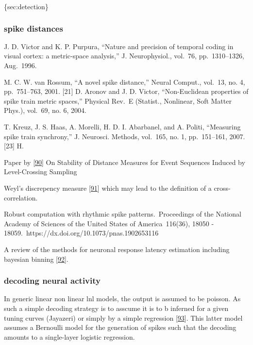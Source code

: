 \{sec:detection\}

\hypertarget{spike-distances}{%
\subsubsection{spike distances}\label{spike-distances}}

J. D. Victor and K. P. Purpura, ``Nature and precision of temporal coding in visual cortex: a metric-space analysis,'' J. Neurophysiol., vol.~76, pp.~1310--1326, Aug.~1996.

M. C. W. van Rossum, ``A novel spike distance,'' Neural Comput., vol.~13, no. 4, pp.~751--763, 2001. {[}21{]} D. Aronov and J. D. Victor, ``Non-Euclidean properties of spike train metric spaces,'' Physical Rev.~E (Statist., Nonlinear, Soft Matter Phys.), vol.~69, no. 6, 2004.

T. Kreuz, J. S. Haas, A. Morelli, H. D. I. Abarbanel, and A. Politi, ``Measuring spike train synchrony,'' J. Neurosci. Methods, vol.~165, no. 1, pp.~151--161, 2007. {[}23{]} H.

Paper by {[}\protect\hyperlink{ref-LjkTSK3h}{90}{]} On Stability of Distance Measures for Event Sequences Induced by Level-Crossing Sampling

Weyl's discrepency measure {[}\protect\hyperlink{ref-RYzP72lj}{91}{]} which may lead to the definition of a cross-correlation.

Robust computation with rhythmic spike patterns.~Proceedings of the National Academy of Sciences of the United States of America~116(36), 18050 - 18059.~https://dx.doi.org/10.1073/pnas.1902653116

A review of the methods for neuronal response latency estimation including bayesian binning {[}\protect\hyperlink{ref-Z7LAUup3}{92}{]}.

\hypertarget{decoding-neural-activity}{%
\subsubsection{decoding neural activity}\label{decoding-neural-activity}}

In generic linear non linear lnl models, the output is assumed to be poisson. As such a simple decoding strategy is to asscume it is to b inferned for a given tuning curves (Jayazeri) or simply by a simple regression {[}\protect\hyperlink{ref-MgINa6bU}{93}{]}. This latter model assumes a Bernoulli model for the generation of spikes such that the decoding amounts to a single-layer logistic regression.

